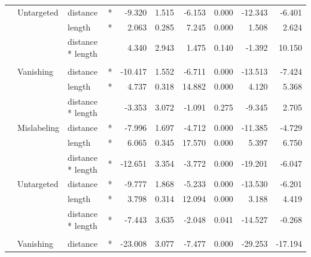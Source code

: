 \begin{longtable}[t]{llllrrrrrr}
\hspace{1em} & Untargeted & distance & * & -9.320 & 1.515 & -6.153 & 0.000 & -12.343 & -6.401\\
\cmidrule{3-10}\nopagebreak
\hspace{1em} &  & length & * & 2.063 & 0.285 & 7.245 & 0.000 & 1.508 & 2.624\\
\cmidrule{3-10}\nopagebreak
\hspace{1em} &  & distance * length &  & 4.340 & 2.943 & 1.475 & 0.140 & -1.392 & 10.150\\
\cmidrule{1-10}\pagebreak[0]
\addlinespace[0.3em]
\multicolumn{10}{l}{\textbf{SSD}}\\
\hspace{1em} & Vanishing & distance & * & -10.417 & 1.552 & -6.711 & 0.000 & -13.513 & -7.424\\
\cmidrule{3-10}\nopagebreak
\hspace{1em} &  & length & * & 4.737 & 0.318 & 14.882 & 0.000 & 4.120 & 5.368\\
\cmidrule{3-10}\nopagebreak
\hspace{1em} &  & distance * length &  & -3.353 & 3.072 & -1.091 & 0.275 & -9.345 & 2.705\\
\cmidrule{2-10}\nopagebreak
\hspace{1em} & Mislabeling & distance & * & -7.996 & 1.697 & -4.712 & 0.000 & -11.385 & -4.729\\
\cmidrule{3-10}\nopagebreak
\hspace{1em} &  & length & * & 6.065 & 0.345 & 17.570 & 0.000 & 5.397 & 6.750\\
\cmidrule{3-10}\nopagebreak
\hspace{1em} &  & distance * length & * & -12.651 & 3.354 & -3.772 & 0.000 & -19.201 & -6.047\\
\cmidrule{2-10}\nopagebreak
\hspace{1em} & Untargeted & distance & * & -9.777 & 1.868 & -5.233 & 0.000 & -13.530 & -6.201\\
\cmidrule{3-10}\nopagebreak
\hspace{1em} &  & length & * & 3.798 & 0.314 & 12.094 & 0.000 & 3.188 & 4.419\\
\cmidrule{3-10}\nopagebreak
\hspace{1em} &  & distance * length & * & -7.443 & 3.635 & -2.048 & 0.041 & -14.527 & -0.268\\
\cmidrule{1-10}\pagebreak[0]
\addlinespace[0.3em]
\multicolumn{10}{l}{\textbf{RetinaNet}}\\
\hspace{1em} & Vanishing & distance & * & -23.008 & 3.077 & -7.477 & 0.000 & -29.253 & -17.194\\

\end{longtable}
